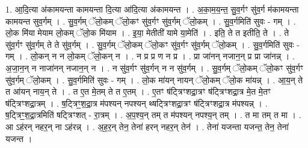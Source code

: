 \documentclass[17pt]{extarticle}
\begin{document}
1. आ॒दि॒त्या अ॑कामयन्ता कामयन्ता दि॒त्या आ॑दि॒त्या अ॑कामयन्त । . अ॒का॒म॒य॒न्त॒ सु॒व॒र्गꣳ सु॑व॒र्ग म॑कामयन्ता कामयन्त सुव॒र्गम् । . सु॒व॒र्गम् ॅलो॒कम् ॅलो॒कꣳ सु॑व॒र्गꣳ सु॑व॒र्गम् ॅलो॒कम् । . सु॒व॒र्गमिति॑ सुवः - गम् । . लो॒क मि॑या मेयाम लो॒कम् ॅलो॒क मि॑याम । . इ॒या॒ मेतीती॑ यामे या॒मेति॑ । . इति॒ ते त इतीति॒ ते । . ते सु॑व॒र्गꣳ सु॑व॒र्गम् ते ते सु॑व॒र्गम् । . सु॒व॒र्गम् ॅलो॒कम् ॅलो॒कꣳ सु॑व॒र्गꣳ सु॑व॒र्गम् ॅलो॒कम् । . सु॒व॒र्गमिति॑ सुवः - गम् । . लो॒कन् न न लो॒कम् ॅलो॒कन् न । . न प्र प्र ण न प्र । . प्रा जा॑नन् नजान॒न् प्र प्रा जा॑नन्न् । . अ॒जा॒न॒न् न नाजा॑नन् नजान॒न् न । . न सु॑व॒र्गꣳ सु॑व॒र्गन् न न सु॑व॒र्गम् । . सु॒व॒र्गम् ॅलो॒कम् ॅलो॒कꣳ सु॑व॒र्गꣳ सु॑व॒र्गम् ॅलो॒कम् । . सु॒व॒र्गमिति॑ सुवः - गम् । . लो॒क मा॑यन् नायन् ॅलो॒कम् ॅलो॒क मा॑यन्न् । . आ॒य॒न् ते त आ॑यन् नाय॒न् ते । . त ए॒त मे॒तम् ते त ए॒तम् । . ए॒तꣳ ष॑ट्त्रिꣳशद्रा॒त्रꣳ ष॑ट्त्रिꣳशद्रा॒त्र मे॒त मे॒तꣳ ष॑ट्त्रिꣳशद्रा॒त्रम् । . ष॒ट्त्रिꣳ॒॒श॒द्रा॒त्र म॑पश्यन् नपश्यन् थ्षट्त्रिꣳशद्रा॒त्रꣳ ष॑ट्त्रिꣳशद्रा॒त्र म॑पश्यन्न् । . ष॒ट्त्रिꣳ॒॒श॒द्रा॒त्रमिति॑ षट्त्रिꣳशत् - रा॒त्रम् । . अ॒प॒श्य॒न् तम् त म॑पश्यन् नपश्य॒न् तम् । . त मा तम् त मा । . आ ऽह॑रन् नहर॒न् ना ऽह॑रन्न् । . अ॒ह॒र॒न् तेन॒ तेना॑ हरन् नहर॒न् तेन॑ । . तेना॑ यजन्ता यजन्त॒ तेन॒ तेना॑ यजन्त । \newline
\end{document}
